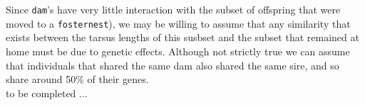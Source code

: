 \documentclass{article}
\begin{document}
Since \texttt{dam}'s have very little interaction with the subset of offspring that were moved to a \texttt{fosternest}), we may be willing to assume that any similarity that exists between the tarsus lengths of this susbset and the subset  that remained at home must be due to genetic effects. Although not strictly true we can assume that individuals that shared the same dam also shared the same sire, and so share around 50\% of their genes.\\

to be completed ...\\    


\ifalone
\end{document}

